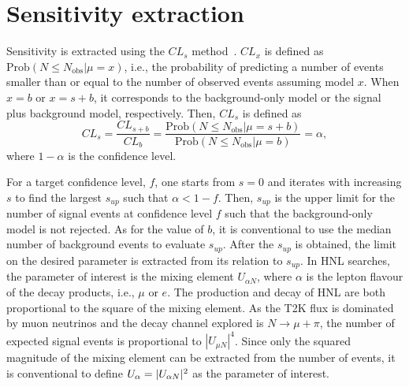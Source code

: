     \section{Sensitivity extraction}
        Sensitivity is extracted using the $CL_s$ method~\cite{Read:2002hq}.
        $CL_x$ is defined as $\textrm{Prob}(N\leq N_{\textrm{obs}}| \mu = x)$, i.e., the probability of predicting a number of events smaller than or equal to the number of observed events assuming model $x$. When $x=b$ or $x=s+b$, it corresponds to the background-only model or the signal plus background model, respectively.
        Then, $CL_s$ is defined as 
        \begin{equation}
            CL_s = \frac{CL_{s+b}}{CL_{b}} = \frac{\textrm{Prob}(N\leq N_{\textrm{obs}}| \mu = s+b)}{\textrm{Prob}(N\leq N_{\textrm{obs}}| \mu = b)} = \alpha,
        \end{equation}
        where $1-\alpha$ is the confidence level.

        For a target confidence level, $f$, one starts from $s=0$ and iterates with increasing $s$ to find the largest $s_{up}$ such that $\alpha < 1-f$. 
        Then, $s_{up}$ is the upper limit for the number of signal events at confidence level $f$ such that the background-only model is not rejected. 
        As for the value of $b$, it is conventional to use the median number of background events to evaluate $s_{up}$.
        After the $s_{up}$ is obtained, the limit on the desired parameter is extracted from its relation to $s_{up}$.
        In HNL searches, the parameter of interest is the mixing element $U_{\alpha N}$, where $\alpha$ is the lepton flavour of the decay products, i.e., $\mu$ or $e$.
        The production and decay of HNL are both proportional to the square of the mixing element.
        As the T2K flux is dominated by muon neutrinos and the decay channel explored is $N\rightarrow\mu+\pi$, the number of expected signal events is proportional to $|U_{\mu N}|^4$.
        Since only the squared magnitude of the mixing element can be extracted from the number of events, it is conventional to define $U_{\alpha}=|U_{\alpha N}|^2$ as the parameter of interest.

